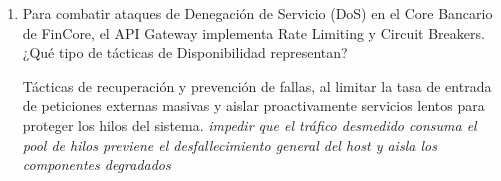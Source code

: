 \begin{enumerate}
\item Para combatir ataques de Denegación de Servicio (DoS) en el Core Bancario de FinCore, el API Gateway implementa Rate Limiting y Circuit Breakers. ¿Qué tipo de tácticas de Disponibilidad representan?


Tácticas de recuperación y prevención de fallas, al limitar la tasa de entrada de peticiones externas masivas y aislar proactivamente servicios lentos para proteger los hilos del sistema. \textit{impedir que el tráfico desmedido consuma el pool de hilos previene el desfallecimiento general del host y aisla los componentes degradados}

\end{enumerate}